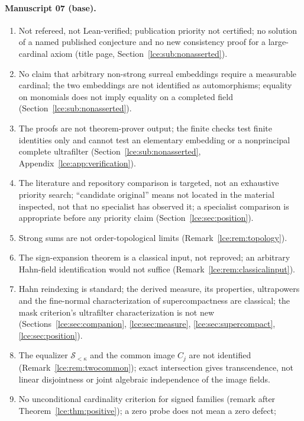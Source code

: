 \documentclass[11pt,letterpaper]{article}
\numberwithin{equation}{section}
\theoremstyle{definition}
\theoremstyle{remark}
\newcommand{\Sk}{\mathscr S_{<\kappa}}
\newcommand{\Common}{C_j}
\newcommand{\thref}[1]{Theorem~\ref{#1}}
\begin{document}
\paragraph{Manuscript 07 (base).}
\begin{enumerate}[label=07.\arabic*]
\item Not refereed, not Lean-verified; publication priority not certified;
no solution of a named published conjecture and no new consistency proof for
a large-cardinal axiom (title page, Section~\ref{lce:sub:nonasserted}).
\item No claim that arbitrary non-strong surreal embeddings require a
measurable cardinal; the two embeddings are not identified as automorphisms;
equality on monomials does not imply equality on a completed field
(Section~\ref{lce:sub:nonasserted}).
\item The proofs are not theorem-prover output; the finite checks test
finite identities only and cannot test an elementary embedding or a
nonprincipal complete ultrafilter (Section~\ref{lce:sub:nonasserted},
Appendix~\ref{lce:app:verification}).
\item The literature and repository comparison is targeted, not an
exhaustive priority search; ``candidate original'' means not located in the
material inspected, not that no specialist has observed it; a specialist
comparison is appropriate before any priority claim
(Section~\ref{lce:sec:position}).
\item Strong sums are not order-topological limits
(Remark~\ref{lce:rem:topology}).
\item The sign-expansion theorem is a classical input, not reproved; an
arbitrary Hahn-field identification would not suffice
(Remark~\ref{lce:rem:classicalinput}).
\item Hahn reindexing is standard; the derived measure, its properties,
ultrapowers and the fine-normal characterization of supercompactness are
classical; the mask criterion's ultrafilter characterization is not new
(Sections~\ref{lce:sec:companion}, \ref{lce:sec:measure},
\ref{lce:sec:supercompact}, \ref{lce:sec:position}).
\item The equalizer $\Sk$ and the common image $\Common$ are not identified
(Remark~\ref{lce:rem:twocommon}); exact intersection gives transcendence,
not linear disjointness or joint algebraic independence of the image fields.
\item No unconditional cardinality criterion for signed families (remark
after \thref{lce:thm:positive}); a zero probe does not mean a zero defect;

\end{enumerate}
\end{document}
